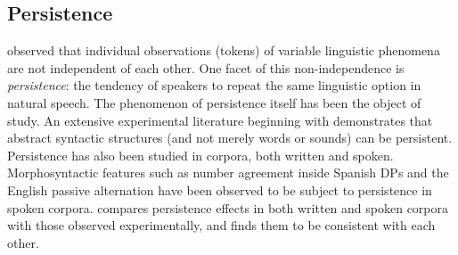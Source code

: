 \documentclass{article}
\begin{document}

\subsection{Persistence}
\label{sec:persist}

\textcite{Sankoff:1978} observed that individual observations (tokens)
of variable linguistic phenomena are not independent of each other.  One
facet of this non-independence is \emph{persistence}: the tendency of
speakers to repeat the same linguistic option in natural speech.  The
phenomenon of persistence itself has been the object of study.  An
extensive experimental literature beginning with \textcite{Bock:1986}
demonstrates that abstract syntactic structures (and not merely words or
sounds) can be persistent.  Persistence has also been studied in
corpora, both written and spoken.  Morphosyntactic features such as
number agreement inside Spanish DPs \parencite{Poplack:1980} and the
English passive alternation \parencite{Weiner:1983} have been observed
to be subject to persistence in spoken corpora.  \textcite{Gries:2005}
compares persistence effects in both written and spoken corpora with
those observed experimentally, and finds them to be consistent with each
other.
\end{document}
